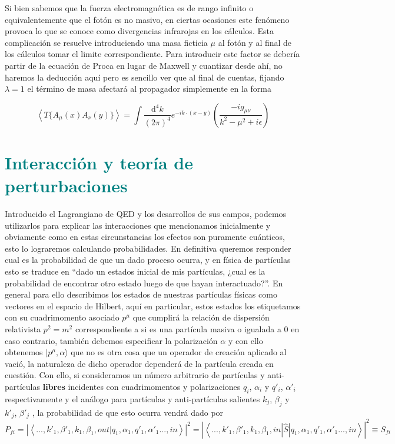\documentclass[tickz]{article}
\numberwithin{equation}{section}
\begin{document}
Si bien sabemos que la fuerza electromagnética es de rango infinito o equivalentemente que el fotón es no masivo, en ciertas ocasiones este fenómeno provoca lo que se conoce como divergencias infrarojas en los cálculos. Esta complicación se resuelve introduciendo una masa ficticia $ \mu $ al fotón y al final de los cálculos tomar el limite correspondiente. Para introducir este factor se debería partir de la ecuación de Proca en lugar de Maxwell y cuantizar desde ahí, no haremos la deducción aquí pero es sencillo ver que al final de cuentas, fijando $ \lambda=1 $ el término de masa afectará al propagador simplemente en la forma

\begin{equation}\label{prop_fotonmu}
\left\langle T\{A_{\mu}(x)A_{\nu}(y)\} \right\rangle =\int\frac{\mathrm{d^4}k}{(2\pi)^{4}}e^{-ik\cdot(x-y)}\left(\frac{-ig_{\mu\nu}}{k^2 -\mu^2 +i\epsilon}\right)
\end{equation} 

\section{\textcolor{teal}{Interacción y teoría de perturbaciones}}

Introducido el Lagrangiano de QED y los desarrollos de sus campos, podemos utilizarlos para explicar
las interacciones que mencionamos inicialmente y obviamente como en
estas circunstancias los efectos son puramente cuánticos, esto lo
lograremos calculando probabilidades. En definitiva queremos responder
cual es la probabilidad de que un dado proceso ocurra, y en física
de partículas esto se traduce en ``dado un estados inicial de mis
partículas, ¿cual es la probabilidad de encontrar otro estado luego
de que hayan interactuado?''. En general para ello describimos los
estados de nuestras partículas físicas como vectores en el espacio
de Hilbert, aquí en particular, estos estados los etiquetamos con
su cuadrimomento asociado $p^{\mu}$ que cumplirá la relación de dispersión
relativista $p^{2}=m^{2}$ correspondiente a si es una partícula masiva
o igualada a $ 0 $ en caso contrario, también debemos especificar la polarización $\alpha$
y con ello obtenemos $|p^{\mu},\alpha \rangle$ que no es otra cosa que un
operador de creación aplicado al vació, la naturaleza de dicho operador
dependerá de la partícula creada en cuestión. Con ello, si consideramos
un número arbitrario de partículas y anti-partículas \textbf{libres
}incidentes con cuadrimomentos y polarizaciones $q_{i}$, $\alpha_{i}$
y $q'_{i}$, $\alpha'_{i}$ respectivamente y el análogo para partículas
y anti-partículas salientes $k_{j}$, $\beta_{j}$
y $k'_{j}$, $\beta'_{j}$ , la probabilidad de que esto ocurra vendrá
dado por
\begin{equation}
P_{fi}=\left|\left\langle ...,k'_{1},\beta'_{1},k_{1},\beta_{1},out|q_{1},\alpha_{1},q'_{1},\alpha'_{1}...,in\right\rangle \right|^{2}=\left|\left\langle ...,k'_{1},\beta'_{1},k_{1},\beta_{1},in|\hat{S}|q_{1},\alpha_{1},q'_{1},\alpha'_{1}...,in\right\rangle \right|^{2}\equiv S_{fi}
\end{equation}
\end{document}
